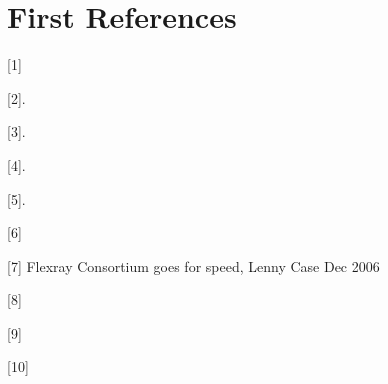 \documentclass[conference]{IEEEtran}
\begin{document}
\section{First References}
[1]\cite{reichart2005flexray}

[2]\cite{vaz2020efficient}.

[3]\cite{steinbach2010comparing}.

[4]\cite{makowitz2006flexray}.

[5]\cite{enosh2014efficient}.

[6]\cite{kopetz2001comparison}

[7] Flexray Consortium goes for speed, Lenny Case Dec 2006

[8]\cite{rausch2007flexray}

[9]\cite{xu2008implementation}


[10]\cite{shaw2008introduction}


\end{document}
